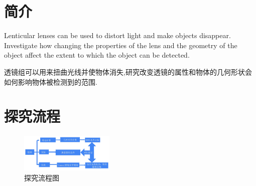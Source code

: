\documentclass[UTF8]{gapd}
\begin{document}
\maketitle


\section{简介}
\label{sec:Introduction}
Lenticular lenses can be used to distort light and make objects disappear. Investigate how changing the properties of the lens and the geometry of the object affect the extent to which the object can be detected.

透镜组可以用来扭曲光线并使物体消失,研究改变透镜的属性和物体的几何形状会如何影响物体被检测到的范围.



\section{探究流程}
\begin{figure}[htbp]
  \centering
  \includegraphics[width=0.4\textwidth]{images/1.jpg}
  \caption{探究流程图}
  \label{fig:1}
\end{figure}
\end{document}
